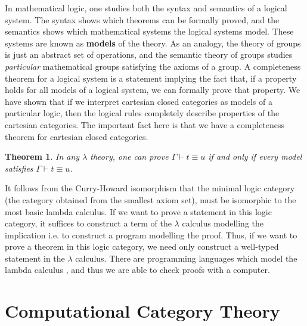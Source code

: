 \documentclass{article}
\theoremstyle{plain}
\newtheorem{theorem}{Theorem}
\begin{document}
In mathematical logic, one studies both the syntax and semantics of a logical system. The syntax shows which theorems can be formally proved, and the semantics shows which mathematical systems the logical systems model. These systems are known as {\bf models} of the theory. As an analogy, the theory of groups is just an abstract set of operations, and the semantic theory of groups studies {\it particular} mathematical groups satisfying the axioms of a group. A completeness theorem for a logical system is a statement implying the fact that, if a property holds for all models of a logical system, we can formally prove that property. We have shown that if we interpret cartesian closed categories as models of a particular logic, then the logical rules completely describe properties of the cartesian categories. The important fact here is that we have a completeness theorem for cartesian closed categories.

\begin{theorem}
    In any $\lambda$ theory, one can prove $\Gamma \vdash t \equiv u$ if and only if every model satisfies $\Gamma \vdash t \equiv u$.
\end{theorem}

It follows from the Curry-Howard isomorphism that the minimal logic category (the category obtained from the smallest axiom set), must be isomorphic to the most basic lambda calculus. If we want to prove a statement in this logic category, it suffices to construct a term of the $\lambda$ calculus modelling the implication i.e. to construct a program modelling the proof. Thus, if we want to prove a theorem in this logic category, we need only construct a well-typed statement in the $\lambda$ calculus. There are programming languages which model the lambda calculus , and thus we are able to check proofs with a computer.

\section{Computational Category Theory}
\end{document}
